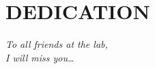 \chapter*{DEDICATION}\thispagestyle{headings}
\begin{flushright}
  \itshape
  To all friends at the lab,\\
  I will miss you\ldots
\end{flushright}

